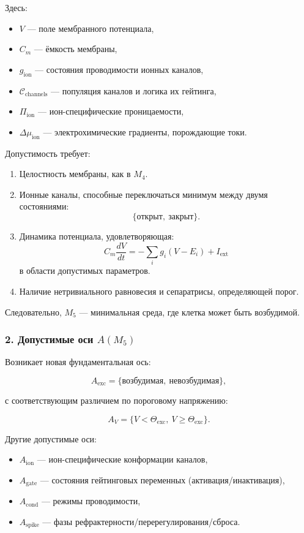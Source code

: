 Здесь:

\begin{itemize}
    \item $V$ — поле мембранного потенциала,
    \item $C_m$ — ёмкость мембраны,
    \item $g_{\mathrm{ion}}$ — состояния проводимости ионных каналов,
    \item $\mathcal{C}_{\mathrm{channels}}$ — популяция каналов и логика их гейтинга,
    \item $\Pi_{\mathrm{ion}}$ — ион-специфические проницаемости,
    \item $\Delta\mu_{\mathrm{ion}}$ — электрохимические градиенты, порождающие токи.
\end{itemize}

Допустимость требует:

\begin{enumerate}
    \item Целостность мембраны, как в $M_4$.
    \item Ионные каналы, способные переключаться минимум между двумя состояниями:
          \[
          \{ \text{открыт},\ \text{закрыт} \}.
          \]
    \item Динамика потенциала, удовлетворяющая:
          \[
          C_m \frac{dV}{dt} = - \sum_i g_i (V - E_i) + I_{\mathrm{ext}}
          \]
          в области допустимых параметров.
    \item Наличие нетривиального равновесия и сепаратрисы, определяющей порог.
\end{enumerate}

Следовательно, $M_5$ — минимальная среда, где клетка может быть возбудимой.

\subsubsection*{2. Допустимые оси \texorpdfstring{$A(M_5)$}{A(M_5)}}

Возникает новая фундаментальная ось:

\[
A_{\mathrm{exc}} = \{ \text{возбудимая},\ \text{невозбудимая} \},
\]

с соответствующим различием по пороговому напряжению:

\[
A_V = \{ V < \Theta_{\mathrm{exc}},\ V \ge \Theta_{\mathrm{exc}} \}.
\]

Другие допустимые оси:

\begin{itemize}
    \item $A_{\mathrm{ion}}$ — ион-специфические конформации каналов,
    \item $A_{\mathrm{gate}}$ — состояния гейтинговых переменных (активация/инактивация),
    \item $A_{\mathrm{cond}}$ — режимы проводимости,
    \item $A_{\mathrm{spike}}$ — фазы рефрактерности/перерегулирования/сброса.
\end{itemize}

